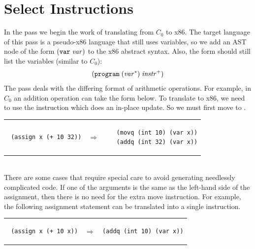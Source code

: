 \documentclass[11pt]{book}
\begin{document}
\section{Select Instructions}
\label{sec:select-s0}

In the  pass we begin the work of translating
from $C_0$ to x86. The target language of this pass is a pseudo-x86
language that still uses variables, so we add an AST node of the form
$(\texttt{var}\;\mathit{var})$ to the x86 abstract syntax. Also, the 
form should still list the variables (similar to $C_0$):
\[
  (\texttt{program}\;(\mathit{var}^{*})\;\mathit{instr}^{+})
\]
The  pass deals with the differing format of
arithmetic operations. For example, in $C_0$ an addition operation can
take the form below.  To translate to x86, we need to use the
 instruction which does an in-place update. So we must first
move  to . \\
\begin{tabular}{lll}
\begin{minipage}{0.4\textwidth}
\begin{lstlisting}
 (assign x (+ 10 32))
\end{lstlisting}
\end{minipage}
&
$\Rightarrow$
&
\begin{minipage}{0.4\textwidth}
\begin{lstlisting}
   (movq (int 10) (var x))
   (addq (int 32) (var x))
\end{lstlisting}
\end{minipage}
\end{tabular} \\

There are some cases that require special care to avoid generating
needlessly complicated code. If one of the arguments is the same as
the left-hand side of the assignment, then there is no need for the
extra move instruction.  For example, the following assignment
statement can be translated into a single  instruction.\\
\begin{tabular}{lll}
\begin{minipage}{0.4\textwidth}
\begin{lstlisting}
 (assign x (+ 10 x))
\end{lstlisting}
\end{minipage}
&
$\Rightarrow$
&
\begin{minipage}{0.4\textwidth}
\begin{lstlisting}
(addq (int 10) (var x))
\end{lstlisting}
\end{minipage}
\end{tabular} \\
\end{document}
